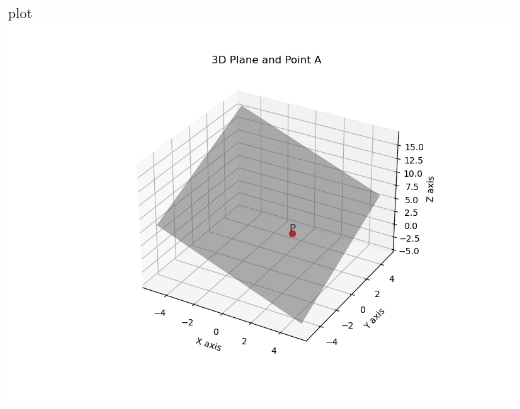 \documentclass{beamer}
\begin{document}
\begin{frame}{plot}
\centering
    \includegraphics[width=\columnwidth, height=0.8\textheight, keepaspectratio]{../figs/fig2.png}     
\end{frame}
\end{document}
